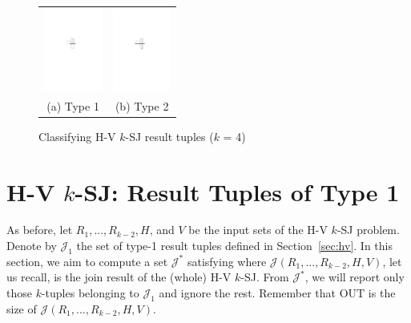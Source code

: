 \documentclass[sigconf]{acmart}
\def\figcapup{\vspace{-0mm}}
\def\figcapdown{\vspace{-0mm}}
\def\J{\mathcal{J}}
\def\out{\mathrm{OUT}}
\begin{document}
\begin{figure}
    \begin{tabular}{cc}
        \includegraphics[height=27mm]{./artwork/type1} &
        \hspace{5mm} \includegraphics[height=27mm]{./artwork/type2} \\
        (a) Type 1 &
        (b) Type 2
    \end{tabular}

    \figcapup
    \caption{Classifying H-V $k$-SJ result tuples ($k$ = 4)}
    \label{fig:hv:types}
    \figcapdown
\end{figure}


\section{H-V $k$-SJ: Result Tuples of Type 1} \label{sec:hv:type1}

As before, let $R_1, ..., R_{k-2}, H$, and $V$ be the input sets of the H-V $k$-SJ problem. Denote by $\J_1$ the set of type-1 result tuples defined in Section~\ref{sec:hv}. In this section, we aim to compute a set $\J^*$ satisfying
\myeqn{
    \J_1
    \subseteq
    \J^*
    \subseteq
    \J(R_1, ..., R_{k-2}, H, V) \label{eqn:hv:type1:J*}
}
where $\J(R_1, ..., R_{k-2}, H, V)$, let us recall, is the join result of the (whole) H-V $k$-SJ. From $\J^*$, we will report only those $k$-tuples belonging to $\J_1$ and ignore the rest. Remember that $\out$ is the size of $\J(R_1, ..., R_{k-2}, H, V)$.
\end{document}
